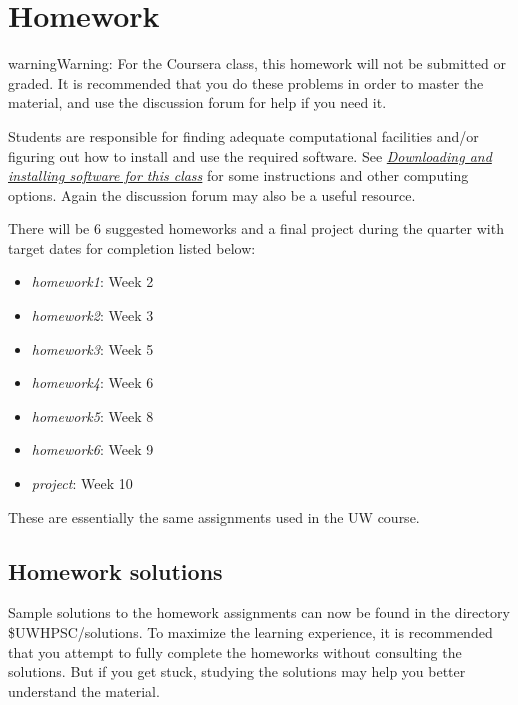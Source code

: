 \documentclass[letterpaper,10pt,english]{sphinxmanual}
\begin{document}
\section{Homework}
\label{homeworks:homeworks}\label{homeworks::doc}\label{homeworks:homework}
\begin{notice}{warning}{Warning:}
For the Coursera class, this homework will not be submitted or
graded.  It is recommended that you do these problems in order
to master the material, and use the discussion forum for help
if you need it.

Students are responsible for finding adequate computational
facilities and/or figuring out how to install and use the required
software.  See {\hyperref[software_installation:software-installation]{\emph{Downloading and installing software for this class}}} for some
instructions and other computing options.  Again the
discussion forum may also be a useful resource.
\end{notice}

There will be 6 suggested homeworks and a final project
during the quarter with target dates for completion listed below:
\begin{itemize}
\item {} 
\emph{homework1}: Week 2

\item {} 
\emph{homework2}: Week 3

\item {} 
\emph{homework3}: Week 5

\item {} 
\emph{homework4}: Week 6

\item {} 
\emph{homework5}: Week 8

\item {} 
\emph{homework6}: Week 9

\item {} 
\emph{project}: Week 10

\end{itemize}

These are essentially the same assignments used in the UW course.


\subsection{Homework solutions}
\label{homeworks:homework-solutions}
Sample solutions to the homework assignments can now be found in
the directory \$UWHPSC/solutions.  To maximize the learning experience,
it is recommended that you attempt to fully complete the homeworks
without consulting the solutions. But if you get stuck, studying
the solutions may help you better understand the material.
\end{document}
